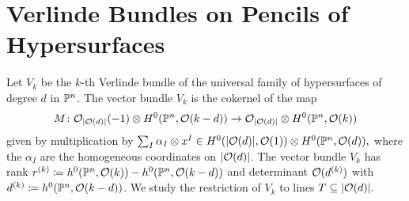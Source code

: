 \section{Verlinde Bundles on Pencils of Hypersurfaces}

\newcommand{\schemeofsurfaces}[1][d]{\abs{\mc{O}(#1)}}
\newcommand{\divides}{\mid}

Let $V_k$ be the $k$-th Verlinde bundle of the universal family of hypersurfaces of degree $d$ in $\mathbb{P}^n$. The vector bundle $V_k$ is the cokernel of the map
\[
M \from \mc{O}_{\schemeofsurfaces}(-1)
\otimes H^0(\PP^n,\mc{O}(k-d))
	\to \mc{O}_{\schemeofsurfaces} \otimes H^0(\PP^n,\mc{O}(k))
\]
given by multiplication by
$\sum_I \alpha_I \otimes x^I
\in H^0(\schemeofsurfaces,\mc{O}(1)) \otimes H^0(\PP^n,\mc{O}(d)),$ where the $\alpha_I$ are the homogeneous coordinates on $\schemeofsurfaces$. The vector bundle $V_k$ has rank $r^{(k)}\coloneqq h^0(\mathbb{P}^n, \mathcal{O}(k))-h^0(\mathbb{P}^n, \mathcal{O}(k-d))$ and determinant $\mathcal{O}(d^{(k)})$ with $d^{(k)}\coloneqq h^0(\mathbb{P}^n,\mathcal{O}(k-d))$.
We study the restriction of $V_k$ to lines $T\subseteq \schemeofsurfaces.$






